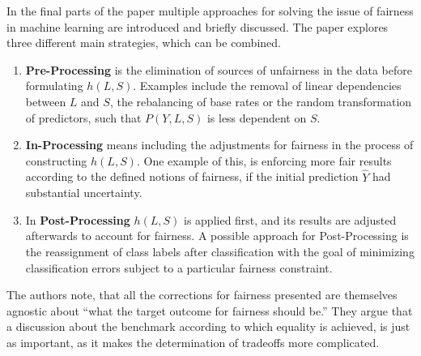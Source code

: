 In the final parts of the paper multiple approaches for solving the issue of fairness in 
machine learning are introduced and briefly discussed. The paper explores three different
main strategies, which can be combined.

\begin{enumerate}
    \item \textbf{Pre-Processing} is the elimination of sources of unfairness in the data before 
    formulating $h(L,S)$. Examples include the removal of linear dependencies between $L$ and
    $S$, the rebalancing of base rates or the random transformation of predictors, such that
    $P(Y,L,S)$ is less dependent on $S$.
    \item \textbf{In-Processing} means including the adjustments for fairness in the process 
    of constructing $h(L,S)$. One example of this, is enforcing more fair results according 
    to the defined notions of fairness, if the initial prediction $\hat{Y}$ had substantial 
    uncertainty.
    \item In \textbf{Post-Processing} $h(L,S)$ is applied first, and its results are adjusted
    afterwards to account for fairness. A possible approach for Post-Processing is the 
    reassignment of class labels after classification with the goal of minimizing 
    classification errors subject to a particular fairness constraint.
\end{enumerate}

The authors note, that all the corrections for fairness presented are themselves agnostic 
about \enquote{what the target outcome for fairness should be.}\cite{Berk.2018} They 
argue that a discussion about the benchmark according to which equality is achieved, is just as
important, as it makes the determination of tradeoffs more complicated.